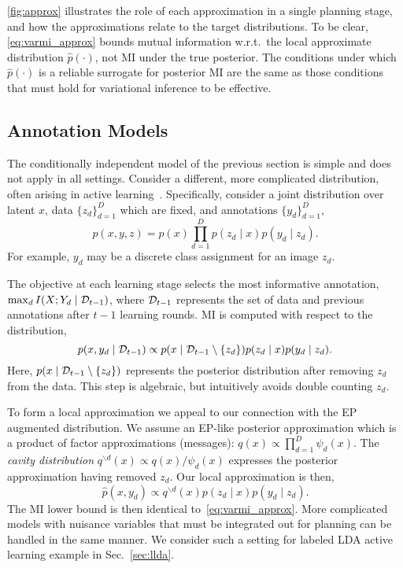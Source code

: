 \FIG\ref{fig:approx} illustrates the role of each approximation in a
single planning stage, and how the approximations relate to the target
distributions.  To be clear, \EQN\eqref{eq:varmi_approx} bounds mutual
information w.r.t.~the local approximate distribution
$\hat{p}(\cdot)$, not MI under the true posterior.  The conditions
under which $\hat{p}(\cdot)$ is a reliable surrogate for posterior MI
are the same as those conditions that must hold for variational
inference to be effective.

\subsection{Annotation Models}\label{sec:annotation}

The conditionally independent model of the previous section is simple
and does not apply in all settings.  Consider a different, more
complicated distribution, often arising in active
learning~\citep{settles2012active}.  Specifically, consider a joint
distribution over latent $x$, data $\{z_d\}_{d=1}^D$ which are fixed,
and annotations $\{y_d\}_{d=1}^D$,
\[
  p(x,y,z) = p(x) \prod_{d=1}^D p(z_d \mid x) p(y_d \mid z_d). 
\]
For example, $y_d$ may be a discrete class assignment for an image
$z_d$.  

The objective at each learning stage selects the most informative
annotation, \mbox{$\max_d I(X;Y_d \mid \mathcal{D}_{t-1})$}, where
$\mathcal{D}_{t-1}$ represents the set of data and previous annotations
after $t-1$ learning rounds.  MI is computed with respect to the
distribution,
\[
  p(x,y_d \mid \mathcal{D}_{t-1}) \propto p(x \mid \mathcal{D}_{t-1} \setminus \{z_d\}) p(z_d \mid
    x ) p(y_d \mid z_d).
\]
Here, $p(x \mid \mathcal{D}_{t-1} \setminus \{z_d\})$ represents the
posterior distribution after removing $z_d$ from the data.  This step
is algebraic, but intuitively avoids double counting $z_d$.

To form a local approximation we appeal to our connection with the EP
augmented distribution.  We assume an EP-like posterior approximation
which is a product of factor approximations (messages): $q(x) \propto
\prod_{d=1}^D \psi_d(x)$.  The \emph{cavity distribution}
$q^{\backslash d}(x) \propto q(x) / \psi_d(x)$ expresses the posterior
approximation having removed $z_d$.  Our local  approximation is then,
\begin{equation}
  \hat{p}(x, y_d) \propto q^{\backslash d}(x) p(z_d \mid x) p(y_d \mid z_d).
\end{equation}
The MI lower bound is then identical to~\eqref{eq:varmi_approx}.  More
complicated models with nuisance variables that must be integrated out
for planning can be handled in the same manner.  We consider such a
setting for labeled LDA active learning example in
Sec.~\ref{sec:llda}.  
